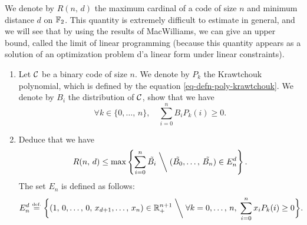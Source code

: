  
\begin{exo}
\label{exo-terminal-linear-programming}
 
     We denote by $ R (n, \, d ) $ the maximum cardinal of a code of size $ n $ and minimum distance $ d $ on $ \mathbb{F}_2 $. This quantity is extremely difficult to estimate in general, and we will see that by using the results of MacWilliams, we can give an upper bound, called the limit of linear programming (because this quantity appears as a solution of an optimization problem d'a linear form under linear constraints). \begin{enumerate}
\item Let $ \mathcal{C} $ be a binary code of size $ n $. We denote by $ P_k $ the  Krawtchouk polynomial, which is defined by the equation \eqref{eq-defn-poly-krawtchouk}. We denote by $ B_i $ the distribution of $ \mathcal{C} $, show that we have
\begin{equation*}
\forall k \in \{0, \ldots, \, n\}, \quad \sum_{i = 0}^n{B_i P_k (i)} \geq 0.
\end{equation*}
 
\item Deduce that we have
\begin{equation*}
R (n, \, d) \leq \max \left\{\sum_{i = 0}^{n}{\tilde{B_i}} \; \bigg \backslash \; (\tilde{B_0}, \ldots, \, \tilde{B_n}) \in E_n^d \right\}.
\end{equation*}
The set $ E_n $ is defined as follows:
\begin{equation*}
E_n^d \stackrel{\mbox{\upshape\tiny def.}}{=} \bigg \{(1, \, 0, \ldots, \, 0, \, x_{d + 1}, \ldots, \, x_n) \in \mathbb{R}_+^{n + 1} \; \bigg \backslash \; \forall k = 0, \ldots, \, n, \; \sum_{i = 0}^n{x_i P_k (i)} \geq 0 \bigg\}.
\end{equation*}
\end{enumerate}
\end{exo}
 

